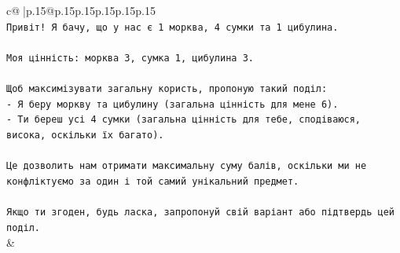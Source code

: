 \documentclass{article}
\begin{document}
{\begin{supertabular}{c@{$\;$}|p{.15\linewidth}@{}p{.15\linewidth}p{.15\linewidth}p{.15\linewidth}p{.15\linewidth}p{.15\linewidth}}
{{{\\ 
\texttt{Привіт! Я бачу, що у нас є 1 морква, 4 сумки та 1 цибулина.} \\
\\ 
\texttt{Моя цінність: морква 3, сумка 1, цибулина 3.} \\
\\ 
\texttt{Щоб максимізувати загальну користь, пропоную такий поділ:} \\
\texttt{{-} Я беру моркву та цибулину (загальна цінність для мене 6).} \\
\texttt{{-} Ти береш усі 4 сумки (загальна цінність для тебе, сподіваюся, висока, оскільки їх багато).} \\
\\ 
\texttt{Це дозволить нам отримати максимальну суму балів, оскільки ми не конфліктуємо за один і той самий унікальний предмет.} \\
\\ 
\texttt{Якщо ти згоден, будь ласка, запропонуй свій варіант або підтвердь цей поділ.} \\
            }
        }
    }
    & \\ \\


\end{supertabular}}
\end{document}
